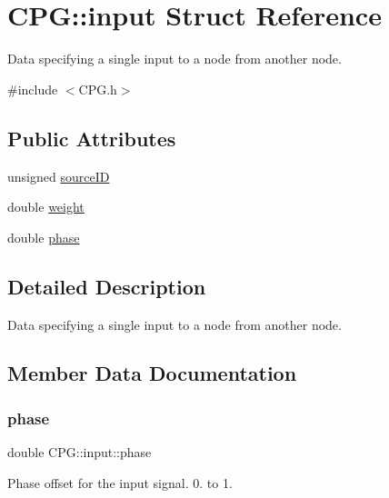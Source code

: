 \hypertarget{structCPG_1_1input}{}\section{C\+PG\+:\+:input Struct Reference}
\label{structCPG_1_1input}


Data specifying a single input to a node from another node.  




{\ttfamily \#include $<$C\+P\+G.\+h$>$}

\subsection*{Public Attributes}
\begin{DoxyCompactItemize}
\item 
unsigned \mbox{\hyperlink{structCPG_1_1input_a17d97be342dfd27e8b027b30f29010e8}{source\+ID}}
\item 
double \mbox{\hyperlink{structCPG_1_1input_a866947e5b7bc9ab1005a2ca72713450c}{weight}}
\item 
double \mbox{\hyperlink{structCPG_1_1input_af1d90c6c6da3fa5dbf73206beb371c32}{phase}}
\end{DoxyCompactItemize}


\subsection{Detailed Description}
Data specifying a single input to a node from another node. 

\subsection{Member Data Documentation}
\mbox{\label{structCPG_1_1input_af1d90c6c6da3fa5dbf73206beb371c32}} 
\subsubsection{\texorpdfstring{phase}{phase}}
{\footnotesize\ttfamily double C\+P\+G\+::input\+::phase}

Phase offset for the input signal. 0. to 1. \mbox{\label{structCPG_1_1input_a17d97be342dfd27e8b027b30f29010e8}} 
